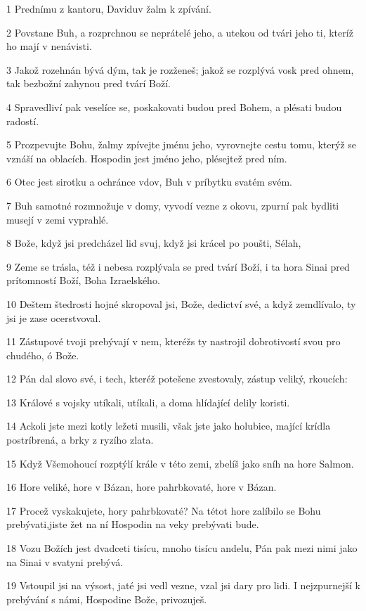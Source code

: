 \par 1 Prednímu z kantoru, Daviduv žalm k zpívání.
\par 2 Povstane Buh, a rozprchnou se neprátelé jeho, a utekou od tvári jeho ti, kteríž ho mají v nenávisti.
\par 3 Jakož rozehnán bývá dým, tak je rozženeš; jakož se rozplývá vosk pred ohnem, tak bezbožní zahynou pred tvárí Boží.
\par 4 Spravedliví pak veselíce se, poskakovati budou pred Bohem, a plésati budou radostí.
\par 5 Prozpevujte Bohu, žalmy zpívejte jménu jeho, vyrovnejte cestu tomu, kterýž se vznáší na oblacích. Hospodin jest jméno jeho, plésejtež pred ním.
\par 6 Otec jest sirotku a ochránce vdov, Buh v príbytku svatém svém.
\par 7 Buh samotné rozmnožuje v domy, vyvodí vezne z okovu, zpurní pak bydliti musejí v zemi vyprahlé.
\par 8 Bože, když jsi predcházel lid svuj, když jsi krácel po poušti, Sélah,
\par 9 Zeme se trásla, též i nebesa rozplývala se pred tvárí Boží, i ta hora Sinai pred prítomností Boží, Boha Izraelského.
\par 10 Deštem štedrosti hojné skropoval jsi, Bože, dedictví své, a když zemdlívalo, ty jsi je zase ocerstvoval.
\par 11 Zástupové tvoji prebývají v nem, kteréžs ty nastrojil dobrotivostí svou pro chudého, ó Bože.
\par 12 Pán dal slovo své, i tech, kteréž potešene zvestovaly, zástup veliký, rkoucích:
\par 13 Králové s vojsky utíkali, utíkali, a doma hlídající delily koristi.
\par 14 Ackoli jste mezi kotly ležeti musili, však jste jako holubice, mající krídla postríbrená, a brky z ryzího zlata.
\par 15 Když Všemohoucí rozptýlí krále v této zemi, zbelíš jako sníh na hore Salmon.
\par 16 Hore veliké, hore v Bázan, hore pahrbkovaté, hore v Bázan.
\par 17 Procež vyskakujete, hory pahrbkovaté? Na tétot hore zalíbilo se Bohu prebývati,jiste žet na ní Hospodin na veky prebývati bude.
\par 18 Vozu Božích jest dvadceti tisícu, mnoho tisícu andelu, Pán pak mezi nimi jako na Sinai v svatyni prebývá.
\par 19 Vstoupil jsi na výsost, jaté jsi vedl vezne, vzal jsi dary pro lidi. I nejzpurnejší k prebývání s námi, Hospodine Bože, privozuješ.
